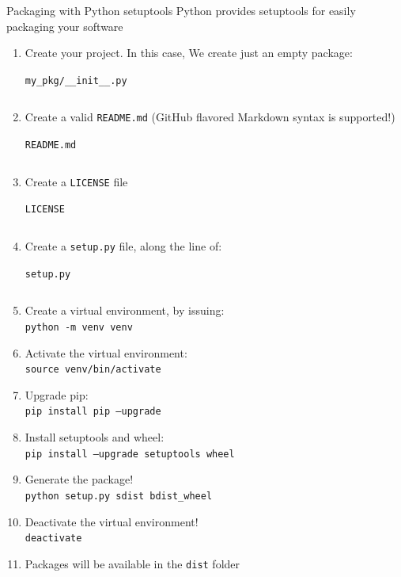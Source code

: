 \documentclass[presentation]{beamer}
\newcommand{\codefile}[4]{
	\begin{block}{\texttt{#2}}
		\inputminted[fontsize=#3,linenos=true,breaklines=true]{#4}{"workspace/#1/#2"}
	\end{block}
}
\newcommand{\python}[3]{\codefile{#1}{#2}{#3}{python}}
\newcommand{\terminal}[3]{\codefile{#1}{#2}{#3}{text}}
\begin{document}
\begin{frame}{Packaging with Python setuptools}
    Python provides setuptools for easily packaging your software
    \begin{enumerate}
        \item Create your project. In this case, We create just an empty package:
        \python{25-setuptools}{my\string_pkg/\string_\string_init\string_\string_.py}{\normalsize}
        \item Create a valid \texttt{README.md} (GitHub flavored Markdown syntax is supported!)
        \terminal{25-setuptools}{README.md}{\scriptsize}
        \item Create a \texttt{LICENSE} file
        \terminal{25-setuptools}{LICENSE}{\scriptsize}
        \item Create a \texttt{setup.py} file, along the line of:
        \python{25-setuptools}{setup.py}{\tiny}
        \item Create a virtual environment, by issuing: \\
        \texttt{python -m venv venv}
        \item Activate the virtual environment: \\
        \texttt{source venv/bin/activate}
        \item Upgrade pip: \\
        \texttt{pip install pip --upgrade}
        \item Install setuptools and wheel: \\
        \texttt{pip install --upgrade setuptools wheel}
        \item Generate the package! \\
        \texttt{python setup.py sdist bdist\string_wheel}
        \item Deactivate the virtual environment! \\
        \texttt{deactivate}
        \item Packages will be available in the \texttt{dist} folder
    \end{enumerate}
\end{frame}

\section*{\refname}
\begin{frame}[allowframebreaks]
  \frametitle{\refname}
  \scriptsize 
  
  
\end{frame}
\section*{\refname}
\end{document}
